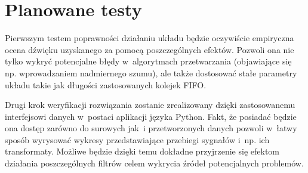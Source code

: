 
\section{Planowane testy}

Pierwszym testem poprawności działaniu układu będzie oczywiście empiryczna ocena dźwięku uzyskanego za pomocą poszczególnych efektów. Pozwoli ona nie tylko wykryć potencjalne błędy w~algorytmach przetwarzania (objawiające się np. wprowadzaniem nadmiernego szumu), ale także dostosować stałe parametry układu takie jak długości zastosowanych kolejek FIFO. 

Drugi krok weryfikacji rozwiązania zostanie zrealizowany dzięki zastosowanemu interfejsowi danych w~postaci aplikacji języka Python. Fakt, że posiadać będzie ona dostęp zarówno do surowych jak~i przetworzonych danych pozwoli w~łatwy sposób wyrysować wykresy przedstawiające przebiegi sygnałów i~np. ich transformaty. Możliwe będzie dzięki temu dokładne przyjrzenie się efektom działania poszczególnych filtrów celem wykrycia źródeł potencjalnych problemów. 
